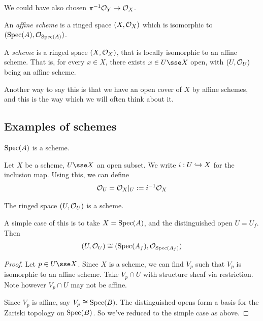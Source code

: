 \documentclass{article}
\begin{document}
\begin{remark}
    We could have also chosen \(\pi^{-1}\mathcal{O}_Y \to \mathcal{O}_X\).
\end{remark}

\begin{definition}
     An \emph{affine scheme} is a ringed space \((X, \mathcal{O}_X)\) which is isomorphic to \((\operatorname{Spec}(A), \mathcal{O}_{\operatorname{Spec}(A)})\).
\end{definition}

\begin{definition}
    [scheme] A \emph{scheme} is a ringed space \((X, \mathcal{O}_X)\), that is locally isomorphic to an affine scheme. That is, for every \(x \in X\), there exists \(x \in U \sse X\) open, with \((U, \mathcal{O}_U)\) being an affine scheme.
\end{definition}

\begin{addendum}
    Another way to say this is that we have an open cover of \(X\) by affine schemes, and this is the way which we will often think about it.
\end{addendum}

\subsection{Examples of schemes}

\begin{example}
    \(\operatorname{Spec}(A)\) is a scheme.
\end{example}

\lec

\begin{example}
     Let \(X\) be a scheme, \(U \sse X\) an open subset. We write \(i : U \hookrightarrow X\) for the inclusion map. Using this, we can define
    \[\mathcal{O}_U = \mathcal{O}_X\vert_U := i^{-1}\mathcal{O}_X\]
\end{example}

\begin{proposition}
    The ringed space \((U, \mathcal{O}_U)\) is a scheme.
\end{proposition}

A simple case of this is to take \(X = \operatorname{Spec}(A)\), and the distinguished open \(U = U_f\). Then
\[(U, \mathcal{O}_U) \cong (\operatorname{Spec}(A_f), \mathcal{O}_{\operatorname{Spec}(A_f)})\]
\begin{proof}
    Let \(p \in U \sse X\). Since \(X\) is a scheme, we can find \(V_p\) such that \(V_p\) is isomorphic to an affine scheme. Take \(V_p \cap U\) with structure sheaf via restriction. Note however \(V_p \cap U\) may not be affine.

    Since \(V_p\) is affine, say \(V_p \cong \operatorname{Spec}(B)\). The distinguished opens form a basis for the Zariski topology on \(\operatorname{Spec}(B)\). So we've reduced to the simple case as above.
\end{proof}
\end{document}
